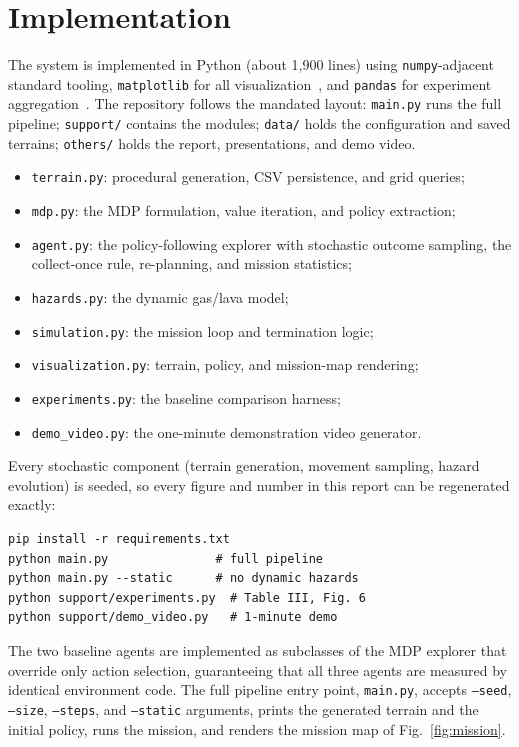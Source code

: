 \documentclass[conference]{IEEEtran}
\begin{document}
\section{Implementation}\label{sec:implementation}

The system is implemented in Python (about 1{,}900 lines) using \texttt{numpy}-adjacent standard tooling, \texttt{matplotlib} for all visualization~\cite{hunter2007}, and \texttt{pandas} for experiment aggregation~\cite{mckinney2010}. The repository follows the mandated layout: \texttt{main.py} runs the full pipeline; \texttt{support/} contains the modules; \texttt{data/} holds the configuration and saved terrains; \texttt{others/} holds the report, presentations, and demo video.

\begin{itemize}
  \item \texttt{terrain.py}: procedural generation, CSV persistence, and grid queries;
  \item \texttt{mdp.py}: the MDP formulation, value iteration, and policy extraction;
  \item \texttt{agent.py}: the policy-following explorer with stochastic outcome sampling, the collect-once rule, re-planning, and mission statistics;
  \item \texttt{hazards.py}: the dynamic gas/lava model;
  \item \texttt{simulation.py}: the mission loop and termination logic;
  \item \texttt{visualization.py}: terrain, policy, and mission-map rendering;
  \item \texttt{experiments.py}: the baseline comparison harness;
  \item \texttt{demo\_video.py}: the one-minute demonstration video generator.
\end{itemize}

Every stochastic component (terrain generation, movement sampling, hazard evolution) is seeded, so every figure and number in this report can be regenerated exactly:

\begin{verbatim}
pip install -r requirements.txt
python main.py               # full pipeline
python main.py --static      # no dynamic hazards
python support/experiments.py  # Table III, Fig. 6
python support/demo_video.py   # 1-minute demo
\end{verbatim}

The two baseline agents are implemented as subclasses of the MDP explorer that override only action selection, guaranteeing that all three agents are measured by identical environment code. The full pipeline entry point, \texttt{main.py}, accepts \texttt{--seed}, \texttt{--size}, \texttt{--steps}, and \texttt{--static} arguments, prints the generated terrain and the initial policy, runs the mission, and renders the mission map of Fig.~\ref{fig:mission}.
\end{document}
